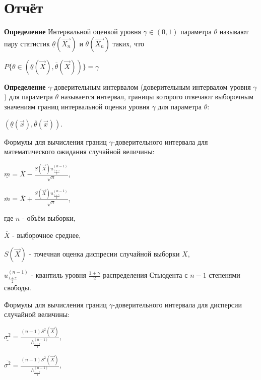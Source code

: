 \chapter*{Отчёт}
\textbf{Определение} Интервальной оценкой уровня $\gamma \in (0, 1)$ параметра $\theta$ называют пару статистик $\underline{\theta}(\vec{X_n})$ и $\overline{\theta}(\vec{X_n})$ таких, что

$P\{\theta \in (\underline{\theta}(\vec{X}), \overline{\theta}(\vec{X}))\} = \gamma$

\textbf{Определение} $\gamma$-доверительным интервалом (доверительным интервалом уровня $\gamma$) для параметра $\theta$ называется интервал, границы которого отвечают выборочным значениям границ интервальной оценки уровня $\gamma$ для параметра $\theta$:

$(\underline{\theta}(\vec{x}), \overline{\theta}(\vec{x}))$. \newline

Формулы для вычисления границ $\gamma$-доверительного интервала для математического ожидания случайной величины:

$\underline{m} = \overline{X} - \frac{S(\vec{X}) u^{(n-1)}_{\frac{1+\gamma}{2}}}{\sqrt{n}}$,

$\overline{m} = \overline{X} + \frac{S(\vec{X}) u^{(n-1)}_{\frac{1+\gamma}{2}}}{\sqrt{n}}$,

где $n$ - объём выборки, 

$\overline{X}$ - выборочное среднее,

$S(\vec{X})$ - точечная оценка диспресии случайной выборки $X$,

$u^{(n-1)}_{\frac{1+\gamma}{2}}$ - квантиль уровня $\frac{1+\gamma}{2}$ распределения Стьюдента с $n-1$ степенями свободы. \newline

Формулы для вычисления границ $\gamma$-доверительного интервала для дисперсии случайной величины:

$\underline{\sigma^2} = \frac{(n-1)S^2(\vec{X})}{h^{(n-1)}_{\frac{1+\gamma}{2}}}$,

$\overline{\sigma^2} = \frac{(n-1)S^2(\vec{X})}{h^{(n-1)}_{\frac{1-\gamma}{2}}}$,

